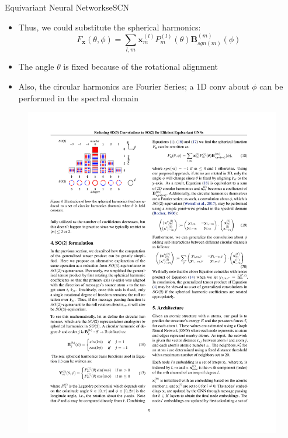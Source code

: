\documentclass[pdf,serif]{beamer}
\begin{document}
\begin{frame}{Equivariant Neural Networks}{eSCN}
    \begin{itemize}
        \item Thus, we could substitute the spherical harmonics:
        $$F_{\mathbf{x}}(\theta, \phi)=\sum_{l, m} \mathbf{x}_m^{(l)} P_m^{(l)}(\theta) \mathbf{B}_{s g n(m)}^{(m)}(\phi)$$

        \item The angle $\theta$ is fixed because of the rotational alignment
        \item Also, the circular harmonics are Fourier Series; a 1D conv about $\phi$ can be performed in the spectral domain
    \end{itemize}
    \begin{figure}
        \includegraphics[width=0.5\linewidth]{images/sc}
    \end{figure}
\end{frame}
\end{document}
